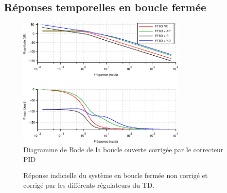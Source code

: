 \subsection*{Réponses temporelles en boucle fermée}

\begin{figure}[!h]
    \centering
    \includegraphics[width=0.75\textwidth]{fig/chap_correction/bode_BOC_all.eps}
    \caption{Diagramme de Bode de la boucle ouverte corrigée par 
    le correcteur PID}
\end{figure}
\clearpage
\begin{figure}
\centering
{}

\caption{Réponse indicielle du système en boucle fermée non corrigé 
         et corrigé par les différents régulateurs 
         du TD.~\label{fig-reponses_indicielles}}
\end{figure}
